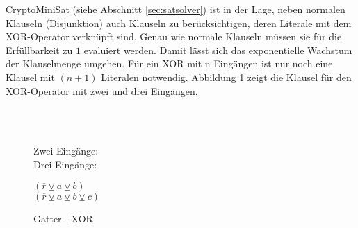 CryptoMiniSat (siehe Abschnitt \ref{sec:satsolver}) ist in der Lage, neben normalen Klauseln (Disjunktion) auch Klauseln zu berücksichtigen, deren Literale
mit dem XOR-Operator verknüpft sind. Genau wie normale Klauseln müssen sie für die Erfüllbarkeit zu $1$ evaluiert werden. Damit lässt sich das exponentielle
Wachstum der Klauselmenge umgehen. Für ein XOR mit n Eingängen ist nur noch eine Klausel mit $ (n + 1) $ Literalen notwendig. Abbildung \ref{fig:gatter_cnf_xor}
zeigt die Klausel für den XOR-Operator mit zwei und drei Eingängen.
\begin{figure}[!h]
  \centering
  \begin{minipage}[l]{1cm}
    ~\\
    ~
  \end{minipage}
  \begin{minipage}[l]{2.5cm}
    Zwei Eingänge:\\
    Drei Eingänge:
  \end{minipage}
  \begin{minipage}[l]{3cm}
    $ (\overline{r} \veebar a \veebar b) $\\
    $ (\overline{r} \veebar a \veebar b \veebar c) $
  \end{minipage}
  \caption{Gatter - XOR}
  \label{fig:gatter_cnf_xor}
\end{figure}
